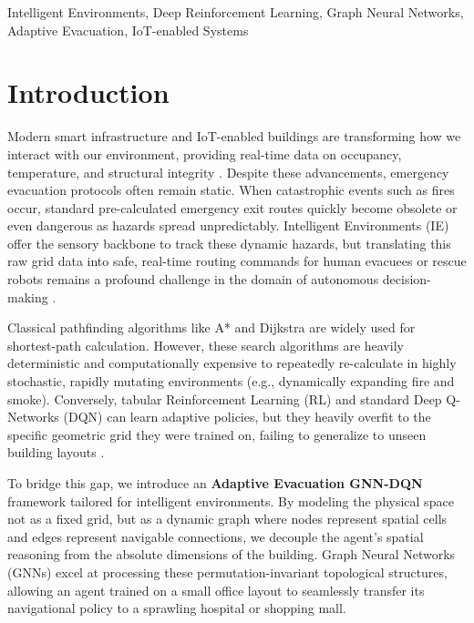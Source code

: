 \documentclass[conference]{IEEEtran}
\begin{document}
\begin{IEEEkeywords}
Intelligent Environments, Deep Reinforcement Learning, Graph Neural Networks, Adaptive Evacuation, IoT-enabled Systems
\end{IEEEkeywords}

\section{Introduction}
Modern smart infrastructure and IoT-enabled buildings are transforming how we interact with our environment, providing real-time data on occupancy, temperature, and structural integrity \cite{iot_smart_buildings}. Despite these advancements, emergency evacuation protocols often remain static. When catastrophic events such as fires occur, standard pre-calculated emergency exit routes quickly become obsolete or even dangerous as hazards spread unpredictably. Intelligent Environments (IE) offer the sensory backbone to track these dynamic hazards, but translating this raw grid data into safe, real-time routing commands for human evacuees or rescue robots remains a profound challenge in the domain of autonomous decision-making \cite{intelligent_evacuation}.

Classical pathfinding algorithms like A* and Dijkstra are widely used for shortest-path calculation. However, these search algorithms are heavily deterministic and computationally expensive to repeatedly re-calculate in highly stochastic, rapidly mutating environments (e.g., dynamically expanding fire and smoke). Conversely, tabular Reinforcement Learning (RL) and standard Deep Q-Networks (DQN) \cite{mnih2015human} can learn adaptive policies, but they heavily overfit to the specific geometric grid they were trained on, failing to generalize to unseen building layouts \cite{rl_generalization}.

To bridge this gap, we introduce an \textbf{Adaptive Evacuation GNN-DQN} framework tailored for intelligent environments. By modeling the physical space not as a fixed grid, but as a dynamic graph where nodes represent spatial cells and edges represent navigable connections, we decouple the agent's spatial reasoning from the absolute dimensions of the building. Graph Neural Networks (GNNs) \cite{kipf2016semi} excel at processing these permutation-invariant topological structures, allowing an agent trained on a small office layout to seamlessly transfer its navigational policy to a sprawling hospital or shopping mall.
\end{document}
